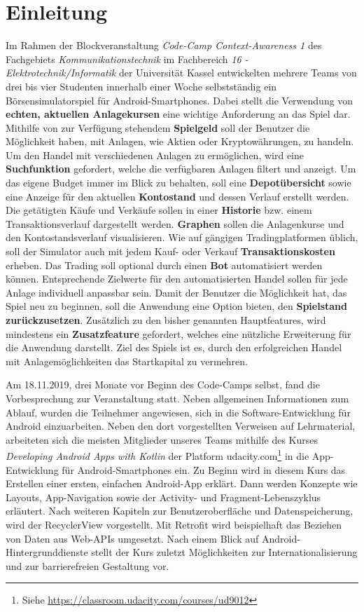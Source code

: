 \documentclass[a4paper]{article}
\begin{document}
\section{Einleitung}
\label{sec:introduction}
Im Rahmen der Blockveranstaltung \textit{Code-Camp Context-Awareness 1} des Fachgebiets \textit{Kommunikationstechnik} im Fachbereich \textit{16 - Elektrotechnik/Informatik} der Universität Kassel entwickelten mehrere Teams von drei bis vier Studenten innerhalb einer Woche selbstständig ein Börsensimulatorspiel für Android-Smartphones. Dabei stellt die Verwendung von \textbf{echten, aktuellen Anlagekursen} eine wichtige Anforderung an das Spiel dar. Mithilfe von zur Verfügung stehendem \textbf{Spielgeld} soll der Benutzer die Möglichkeit haben, mit Anlagen, wie Aktien oder Kryptowährungen, zu handeln. Um den Handel mit verschiedenen Anlagen zu ermöglichen, wird eine \textbf{Suchfunktion} gefordert, welche die verfügbaren Anlagen filtert und anzeigt. Um das eigene Budget immer im Blick zu behalten, soll eine \textbf{Depotübersicht} sowie eine Anzeige für den aktuellen \textbf{Kontostand} und dessen Verlauf erstellt werden. Die getätigten Käufe und Verkäufe sollen in einer \textbf{Historie} bzw. einem Transaktionsverlauf dargestellt werden. \textbf{Graphen} sollen die Anlagenkurse und den Kontostandsverlauf visualisieren. Wie auf gängigen Tradingplatformen üblich, soll der Simulator auch mit jedem Kauf- oder Verkauf \textbf{Transaktionskosten} erheben. Das Trading soll optional durch einen \textbf{Bot} automatisiert werden können. Entsprechende Zielwerte für den automatisierten Handel sollen für jede Anlage individuell anpassbar sein. Damit der Benutzer die Möglichkeit hat, das Spiel neu zu beginnen, soll die Anwendung eine Option bieten, den \textbf{Spielstand zurückzusetzen}. Zusätzlich zu den bisher genannten Hauptfeatures, wird mindestens ein \textbf{Zusatzfeature} gefordert, welches eine nützliche Erweiterung für die Anwendung darstellt. Ziel des Spiels ist es, durch den erfolgreichen Handel mit Anlagemöglichkeiten das Startkapital zu vermehren.

Am 18.11.2019, drei Monate vor Beginn des Code-Camps selbst, fand die Vorbesprechung zur Veranstaltung statt. Neben allgemeinen Informationen zum Ablauf, wurden die Teilnehmer angewiesen, sich in die Software-Entwicklung für Android einzuarbeiten. Neben den dort vorgestellten Verweisen auf Lehrmaterial, arbeiteten sich die meisten Mitglieder unseres Teams mithilfe des Kurses \textit{Developing Android Apps with Kotlin} der Platform udacity.com\footnote{Siehe \url{https://classroom.udacity.com/courses/ud9012}} in die App-Entwicklung für Android-Smartphones ein. Zu Beginn wird in diesem Kurs das Erstellen einer ersten, einfachen Android-App erklärt. Dann werden Konzepte wie Layouts, App-Navigation sowie der Activity- und Fragment-Lebenszyklus erläutert. Nach weiteren Kapiteln zur Benutzeroberfläche und Datenspeicherung, wird der RecyclerView vorgestellt. Mit Retrofit wird beispielhaft das Beziehen von Daten aus Web-APIs umgesetzt. Nach einem Blick auf Android-Hintergrunddienste stellt der Kurs zuletzt Möglichkeiten zur Internationalisierung und zur barrierefreien Gestaltung vor.
\end{document}
